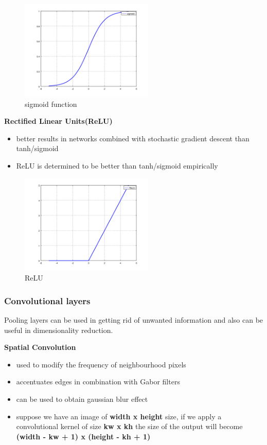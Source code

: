 \begin{figure}[h]
	\begin{center}
		\includegraphics[width=240px,height=180px]{src/img/state/sigmoid}
		\caption{sigmoid function} \label{fig:sigmoid}
    \end{center}
\end{figure}
\newpage
\textbf{Rectified Linear Units(ReLU)}
\begin{itemize}
	\item better results in networks combined with stochastic gradient descent than tanh/sigmoid\cite{imagenet}
	\item ReLU is determined to be better than tanh/sigmoid empirically
\end{itemize}

\begin{figure}[h]
	\begin{center}
		\includegraphics[width=240px,height=180px]{src/img/state/relu}
		\caption{ReLU} \label{fig:relu}
    \end{center}
\end{figure}

\newpage
\subsubsection{Convolutional layers}
Pooling layers can be used in getting rid of unwanted information and also can be useful in dimensionality reduction.

\textbf{Spatial Convolution}
\begin{itemize}
	\item{used to modify the frequency of neighbourhood pixels}
	\item{accentuates edges in combination with Gabor filters}
	\item{can be used to obtain gaussian blur effect}
	\item{suppose we have an image of \textbf{width x height} size, if we apply a convolutional kernel of size \textbf{kw x kh} the size of the output will become \textbf{(width - kw + 1) x (height - kh + 1)}}
\end{itemize}


